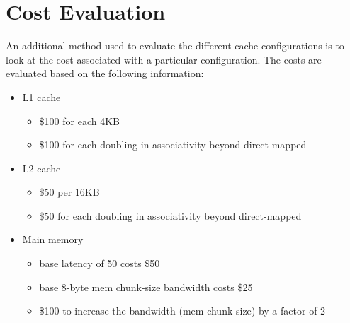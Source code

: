 \documentclass[11pt,titlepage]{article}
\begin{document}
\section{Cost Evaluation}
An additional method used to evaluate the different cache configurations is to look at the cost associated with a particular configuration. The costs are evaluated based on the following information:
\begin{itemize}
\item L1 cache
  \begin{itemize}
  \item \$100 for each 4KB
  \item \$100 for each doubling in associativity beyond direct-mapped
  \end{itemize}
\item L2 cache
  \begin{itemize}
  \item \$50 per 16KB
  \item \$50 for each doubling in associativity beyond direct-mapped
  \end{itemize}
\item Main memory
  \begin{itemize}
  \item base latency of 50 costs \$50
  \item base 8-byte mem chunk-size bandwidth costs \$25
  \item \$100 to increase the bandwidth (mem chunk-size) by a factor
    of 2
  \end{itemize}
\end{itemize}
\end{document}
